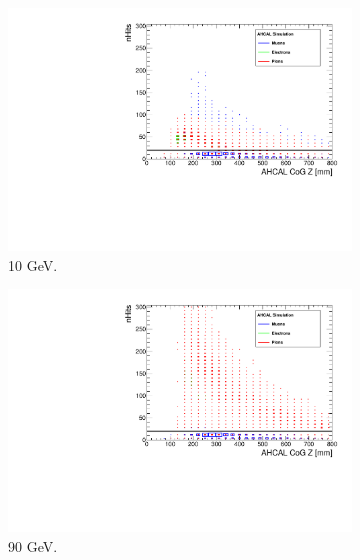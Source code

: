\begin{figure}[htbp!]
\begin{subfigure}[t]{0.5\textwidth}
		\includegraphics[width=1\linewidth]{../Thesis_Plots/Timing/Pions/Plots/SelectionCut_nHitsCoGZ_10GeV}
		\caption{10 GeV.} \label{fig:pi10GeV_nHitsCoGZ}
	\end{subfigure}
	\hfill
	\begin{subfigure}[t]{0.5\textwidth}
		\centering
		\includegraphics[width=1\linewidth]{../Thesis_Plots/Timing/Pions/Plots/SelectionCut_nHitsCoGZ_90GeV}
		\caption{90 GeV.} \label{fig:pi90GeV_nHitsCoGZ}
	\end{subfigure}
	\hfill
	\begin{subfigure}[t]{0.5\textwidth}
		\centering

\end{subfigure}
\end{figure}
